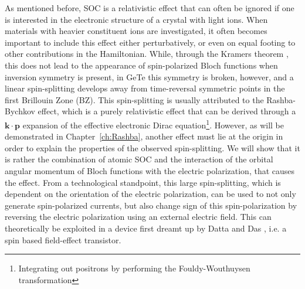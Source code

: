 As mentioned before, SOC is a relativistic effect that can often be ignored if one is interested in the electronic structure of a crystal with light ions.
When materials with heavier constituent ions are investigated, it often becomes important to include this effect either perturbatively, or even on equal footing to other contributions in the Hamiltonian.
While, through the Kramers theorem \cite{Kramerstheorem}, this does not lead to the appearance of spin-polarized Bloch functions when inversion symmetry is present, in GeTe this symmetry is broken, however, and a linear spin-splitting develops away from time-reversal symmetric points in the first Brillouin Zone (BZ).
This spin-splitting is usually attributed to the Rashba-Bychkov effect, which is a purely relativistic effect that can be derived through a $\bm{k}\cdot \bm{p}$ expansion of the effective electronic Dirac equation\footnote{Integrating out positrons by performing the Fouldy-Wouthuysen transformation}.
However, as will be demonstrated in Chapter~\ref{ch:Rashba}, another effect must lie at the origin in order to explain the properties of the observed spin-splitting.
We will show that it is rather the combination of atomic SOC and the interaction of the orbital angular momentum of Bloch functions with the electric polarization, that causes the effect.
From a technological standpoint, this large spin-splitting, which is dependent on the orientation of the electric polarization, can be used to not only generate spin-polarized currents, but also change sign of this spin-polarization by reversing the electric polarization using an external electric field.
This can theoretically be exploited in a device first dreamt up by Datta and Das , i.e. a spin based field-effect transistor.

